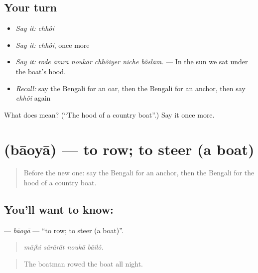 \subsection*{Your turn}
\begin{itemize}
\raggedright
  \item \emph{Say it:} \emph{chhôi}
  \item \emph{Say it:} \emph{chhôi}, once more
  \item \emph{Say it:} \emph{rode āmrā noukār chhôiyer niche bôslām.} — In the sun we sat under the boat's hood.
  \item \emph{Recall:} say the Bengali for an oar, then the Bengali for an anchor, then say \emph{chhôi} again
\end{itemize}

\begin{tcolorbox}[breakable,colback=teal!4,colframe=teal!35!black,title={Before you move on}]
What does  mean? (\textquotedblleft{}The hood of a country boat\textquotedblright{}.) Say it once more.
\end{tcolorbox}
\section[\texorpdfstring{\bn{বাওয়া} (bāoyā)}{বাওয়া (bāoyā)}]{ (bāoyā) — to row; to steer (a boat)}

\label{lesson:BN-C396-baoya}



\begin{quote}
Before the new one: say the Bengali for an anchor, then the Bengali for the hood of a country boat.
\end{quote}

\subsection*{You'll want to know: }
\textbf{} — \emph{bāoyā} — \textquotedblleft{}to row; to steer (a boat)\textquotedblright{}.

\begin{quote}
   
\end{quote}

\begin{quote}
\emph{mājhi sārārāt noukā bāilô.}
\end{quote}

\begin{quote}
The boatman rowed the boat all night.
\end{quote}

